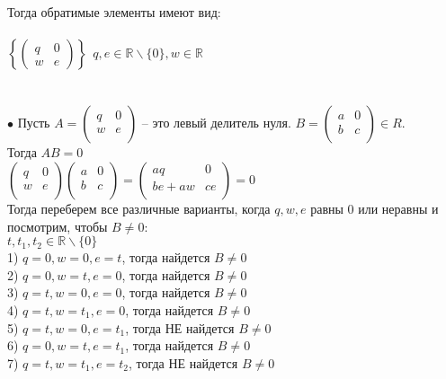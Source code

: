 \documentclass[12pt,a4paper]{scrartcl}
\begin{document}
	Тогда обратимые элементы имеют вид:\\ 
	\\
	$ \left\{ \begin{pmatrix}
	q&0\\
	w&e
	\end{pmatrix} \right\}~~ q, e \in \mathbb{R} \backslash \{0\}, w \in \mathbb{R}$\\
	\\
	\\
	$\bullet$ Пусть $A = \begin{pmatrix}
	q&0\\
	w&e\\
	\end{pmatrix}$ -- это левый делитель нуля. $B = \begin{pmatrix}
	a&0\\
	b&c\\
	\end{pmatrix} \in R$.\\
	Тогда $AB = 0$ \\
	$\begin{pmatrix}
	q&0\\
	w&e\\
	\end{pmatrix} \begin{pmatrix}
	a&0\\
	b&c\\
	\end{pmatrix} = \begin{pmatrix}
	aq&0\\
	be + aw&ce\\
	\end{pmatrix} = 0$\\
	Тогда переберем все различные варианты, когда $q, w, e$ равны 0 или неравны и посмотрим, чтобы $B \neq 0$:\\
	$t, t_1, t_2 \in \mathbb{R} \backslash \{0\}$ \\
	1) $q = 0, w = 0, e = t$, тогда найдется $B \neq 0$\\
	2) $q = 0, w = t, e = 0$, тогда найдется $B \neq 0$\\
	3) $q = t, w = 0, e = 0$, тогда найдется $B \neq 0$\\
	4) $q = t, w = t_1, e = 0$, тогда найдется $B \neq 0$\\
	5) $q = t, w = 0, e = t_1$, тогда НЕ найдется $B \neq 0$\\
	6) $q = 0, w = t, e = t_1$, тогда найдется $B \neq 0$\\
	7) $q = t, w = t_1, e = t_2$, тогда НЕ найдется $B \neq 0$\\
\end{document}
